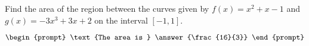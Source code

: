 \documentclass{ximera}
\author{Gregory Hartman \and Matthew Carr}
\begin{document}
\begin{exercise}






Find the area of the region between the curves given by $f(x)=x^2+x-1$ and $g(x)=-3x^3+3x+2$ on the interval $[-1,1]$.

\[
\begin{prompt}
\text{The area is } \answer{\frac{16}{3}}
\end{prompt}
\]




\end{exercise}
\end{document}
